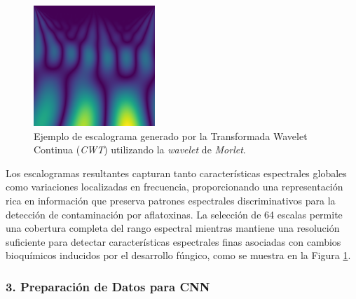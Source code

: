 \begin{figure}[ht]
\centering
\includegraphics[width=\textwidth]{images/CWT_morl_Fx10_20230717_Riego_C0_2023-07-17_09-02-21_ann0_patch_00.png}
\caption{Ejemplo de escalograma generado por la Transformada Wavelet Continua (\emph{CWT}) utilizando la \emph{wavelet} de \emph{Morlet}.}
\label{fig:cwt_morl_example}
\end{figure}

\vspace{5mm}

Los escalogramas resultantes capturan tanto características espectrales globales como variaciones localizadas en frecuencia, proporcionando una representación rica en información que preserva patrones espectrales discriminativos para la detección de contaminación por aflatoxinas. La selección de 64 escalas permite una cobertura completa del rango espectral mientras mantiene una resolución suficiente para detectar características espectrales finas asociadas con cambios bioquímicos inducidos por el desarrollo fúngico, como se muestra en la Figura \ref{fig:cwt_morl_example}.

\subsubsection{3. Preparación de Datos para CNN}

